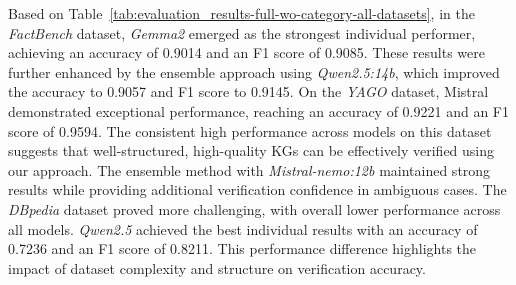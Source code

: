 Based on Table~\ref{tab:evaluation_results-full-wo-category-all-datasets}, in the \textit{FactBench} dataset, \textit{Gemma2} emerged as the strongest individual performer, achieving an accuracy of 0.9014 and an F1 score of 0.9085.
These results were further enhanced by the ensemble approach using \textit{Qwen2.5:14b}, which improved the accuracy to 0.9057 and F1 score to 0.9145.
On the \textit{YAGO} dataset, Mistral demonstrated exceptional performance, reaching an accuracy of 0.9221 and an F1 score of 0.9594.
The consistent high performance across models on this dataset suggests that well-structured, high-quality \acp{KG} can be effectively verified using our approach.
The ensemble method with \textit{Mistral-nemo:12b} maintained strong results while providing additional verification confidence in ambiguous cases.
The \textit{DBpedia} dataset proved more challenging, with overall lower performance across all models.
\textit{Qwen2.5} achieved the best individual results with an accuracy of 0.7236 and an F1 score of 0.8211.
This performance difference highlights the impact of dataset complexity and structure on verification accuracy.

